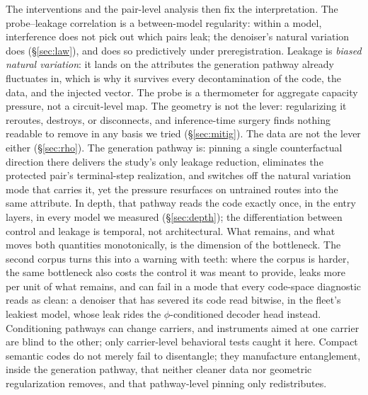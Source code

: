 \documentclass[11pt]{article}
\begin{document}
The interventions and the pair-level analysis then fix the interpretation. The
probe--leakage correlation is a between-model regularity: within a model,
interference does not pick out which pairs leak; the denoiser's natural variation
does (\S\ref{sec:law}), and does so predictively under preregistration. Leakage is
\emph{biased natural variation}: it lands on the attributes the generation pathway
already fluctuates in, which is why it survives every decontamination of the code,
the data, and the injected vector. The probe is a thermometer for aggregate
capacity pressure, not a circuit-level map. The geometry is not the lever: regularizing it reroutes,
destroys, or disconnects, and inference-time surgery finds nothing readable
to remove in any basis we tried (\S\ref{sec:mitig}). The data are not the lever either
(\S\ref{sec:rho}). The generation pathway is: pinning a single counterfactual
direction there delivers the study's only leakage reduction, eliminates the
protected pair's terminal-step realization, and switches off the natural
variation mode that carries it, yet the pressure resurfaces on untrained routes
into the same attribute. In depth, that pathway reads the code exactly once,
in the entry layers, in every model we measured (\S\ref{sec:depth}); the
differentiation between control and leakage is temporal, not architectural.
What remains, and what moves both quantities monotonically, is the dimension
of the bottleneck. The second corpus turns this into a warning with teeth:
where the corpus is harder, the same bottleneck also costs the control it
was meant to provide, leaks more per unit of what remains, and can fail in a
mode that every code-space diagnostic reads as clean: a denoiser that has
severed its code read bitwise, in the fleet's leakiest model, whose leak
rides the $\phi$-conditioned decoder head instead. Conditioning pathways can
change carriers, and instruments aimed at one carrier are blind to the
other; only carrier-level behavioral tests caught it here. Compact semantic
codes do not merely fail to disentangle; they manufacture entanglement,
inside the generation pathway, that neither cleaner data nor geometric
regularization removes, and that pathway-level pinning only redistributes.
\end{document}
